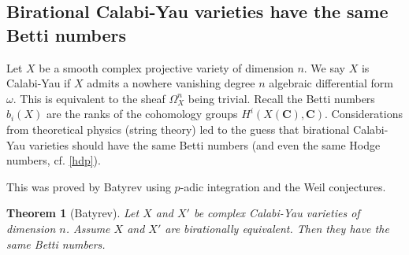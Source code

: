 \documentclass[english,12pt]{amsart}
\def\CC{{\mathbf C}}
\newtheorem{theorem}[subsubsection]{Theorem}
\theoremstyle{definition}
\theoremstyle{remark}
\theoremstyle{plain}
\numberwithin{equation}{subsection}
\def\CC{{\mathbf C}}
\begin{document}
\subsection{Birational Calabi-Yau varieties have the same
Betti numbers}\label{cy}

Let $X$ be a smooth complex projective variety of dimension $n$. We say $X$
is Calabi-Yau if $X$ admits
a nowhere vanishing degree $n$ algebraic
differential form $\omega$. This is equivalent to
the sheaf $\Omega^n_X$ being trivial.
Recall the Betti numbers $b_i (X)$ are the ranks of the cohomology
groups $H^i (X (\CC), \CC)$.
Considerations from theoretical physics (string theory)
led to the guess that 
birational Calabi-Yau varieties should have the same
Betti numbers (and even the same Hodge numbers, cf. \ref{hdp}).


This was proved by Batyrev \cite{batyrev} using
$p$-adic integration and the Weil conjectures.


\begin{theorem}[Batyrev]\label{bat}Let $X$ and $X'$ be complex
Calabi-Yau varieties of dimension $n$.
Assume 
$X$ and $X'$  are birationally equivalent.
Then they have the same Betti numbers.
\end{theorem}
\end{document}
